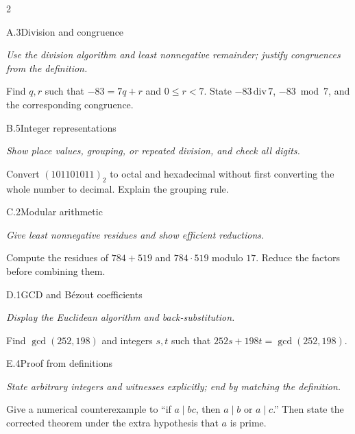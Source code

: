 \documentclass[9pt]{extarticle}
\begin{document}
\begin{multicols}{2}
\begin{CoreProblem}{A.3}{Division and congruence}
{\scriptsize\textit{Use the division algorithm and least nonnegative remainder; justify congruences from the definition.}\par}
Find $q,r$ such that $-83=7q+r$ and $0\le r<7$. State
$-83\,\mathrm{div}\,7$, $-83\bmod7$, and the corresponding congruence.
\end{CoreProblem}
\begin{CoreProblem}{B.5}{Integer representations}
{\scriptsize\textit{Show place values, grouping, or repeated division, and check all digits.}\par}
Convert $(101101011)_2$ to octal and hexadecimal without first converting the
whole number to decimal. Explain the grouping rule.
\end{CoreProblem}
\begin{CoreProblem}{C.2}{Modular arithmetic}
{\scriptsize\textit{Give least nonnegative residues and show efficient reductions.}\par}
Compute the residues of $784+519$ and $784\cdot519$ modulo $17$. Reduce the
factors before combining them.
\end{CoreProblem}
\columnbreak
\begin{CoreProblem}{D.1}{GCD and B\'ezout coefficients}
{\scriptsize\textit{Display the Euclidean algorithm and back-substitution.}\par}
Find $\gcd(252,198)$ and integers $s,t$ such that
$252s+198t=\gcd(252,198)$.
\end{CoreProblem}
\begin{CoreProblem}{E.4}{Proof from definitions}
{\scriptsize\textit{State arbitrary integers and witnesses explicitly; end by matching the definition.}\par}
Give a numerical counterexample to ``if $a\mid bc$, then $a\mid b$ or
$a\mid c$.'' Then state the corrected theorem under the extra hypothesis that
$a$ is prime.
\end{CoreProblem}
\end{multicols}
\CoreWorkArea
\FormBreak
{}
\end{document}
